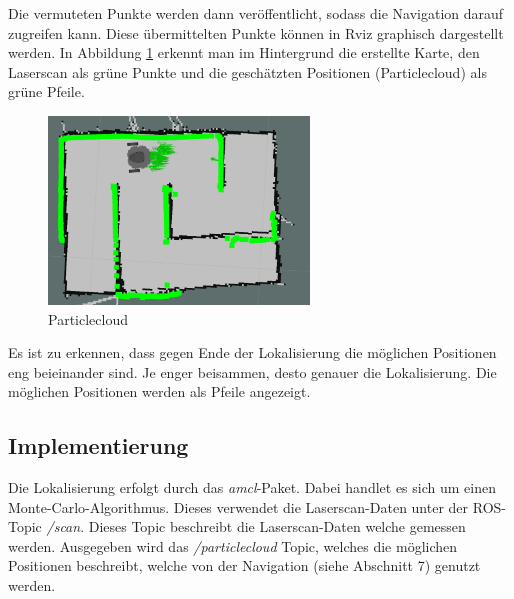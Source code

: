 {{		Die vermuteten Punkte werden dann veröffentlicht, sodass die Navigation darauf zugreifen kann. Diese übermittelten Punkte können in Rviz graphisch dargestellt werden. In Abbildung \ref{pic:amclclearpos} erkennt man im Hintergrund die erstellte Karte, den Laserscan als grüne Punkte und die geschätzten Positionen (Particlecloud) als grüne Pfeile.
		
	\begin{figure}[H]
		\centering
		\includegraphics[height=5cm]{Bilder/amcl_clear_pointcloud.png}
		\caption{Particlecloud} 
		\label{pic:amclclearpos}
	\end{figure}

	Es ist zu erkennen, dass gegen Ende der Lokalisierung  die möglichen Positionen eng beieinander sind. Je enger beisammen, desto genauer die Lokalisierung. Die möglichen Positionen werden als Pfeile angezeigt.
	}

	\subsection{Implementierung}
	{
		Die Lokalisierung erfolgt durch das \emph{amcl}-Paket. Dabei handlet es sich um einen Monte-Carlo-Algorithmus. Dieses verwendet die Laserscan-Daten unter der ROS-Topic \emph{/scan}. Dieses Topic beschreibt die Laserscan-Daten welche gemessen werden. Ausgegeben wird das \emph{/particlecloud} Topic, welches die möglichen Positionen beschreibt, welche von der Navigation (siehe Abschnitt 7) genutzt werden.
	}
}